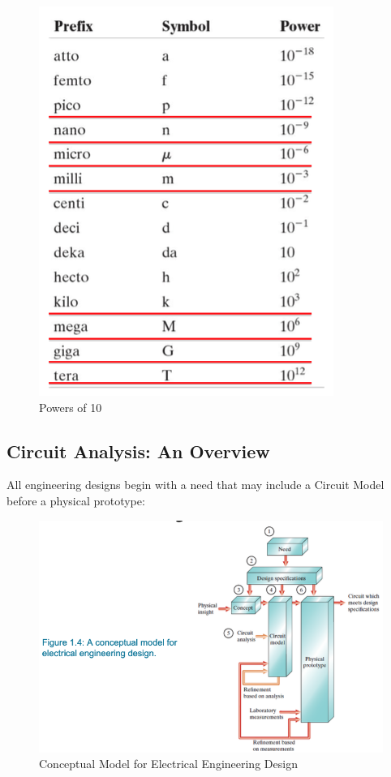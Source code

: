 \documentclass[14pt]{memoir}
\begin{document}
\begin{figure}[!h]
\begin{center}
\includegraphics[scale=0.40]{fig/tab01_03.png}
\caption{Powers of 10}
\label{fig:t01_03}
\end{center}
\end{figure}

\subsection{Circuit Analysis: An Overview}

All engineering designs begin with a need that may include a Circuit Model before a physical prototype:

\begin{figure}[h]
\begin{center}
\includegraphics[scale=0.65]{fig/fig01_04.png}
\caption{Conceptual Model for Electrical Engineering Design}
\label{fig:f01_04}
\end{center}
\end{figure}
\end{document}
